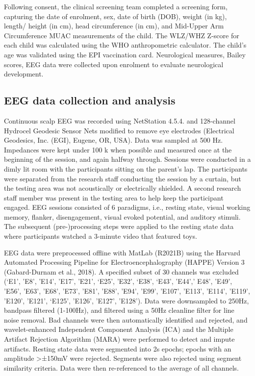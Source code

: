 \documentclass{article}
\begin{document}
Following consent, the clinical screening team completed a screening form, capturing the date of enrolment, sex, date of birth (DOB), weight (in kg), length/ height (in cm), head circumference (in cm), and Mid-Upper Arm Circumference \gls{MUAC} measurements of the child.
The \gls{WLZ/WHZ} Z-score for each child was calculated using the WHO anthropometric calculator.
The child's age was validated using the EPI vaccination card.
Neurological measures, Bailey scores, EEG data were collected upon enrolment to evaluate neurological development.

\subsection*{EEG data collection and analysis}
Continuous scalp EEG was recorded using NetStation 4.5.4. and 128-channel Hydrocel Geodesic Sensor Nets modified to remove eye electrodes (Electrical Geodesics, Inc. (EGI), Eugene, OR, USA).
Data was sampled at 500 Hz.
Impedances were kept under 100 k \textomega{} when possible and measured once at the beginning of the session, and again halfway through.
Sessions were conducted in a dimly lit room with the participants sitting on the parent’s lap.
The participants were separated from the research staff conducting the session by a curtain, but the testing area was not acoustically or electrically shielded.
A second research staff member was present in the testing area to help keep the participant engaged.
EEG sessions consisted of 6 paradigms, i.e., resting state, visual working memory, flanker, disengagement, visual evoked potential, and auditory stimuli.
The subsequent (pre-)processing steps were applied to the resting state data where participants watched a 3-minute video that featured toys.

EEG data were preprocessed offline with MatLab (R2021B) using the Harvard Automated Processing Pipeline for Electroencephalography (HAPPE) Version 3 (Gabard-Durnam et al., 2018).
A specified subset of 30 channels was excluded (‘E1’, ’E8’, ’E14’, ’E17’, ’E21’, ‘E25’, ’E32’, ‘E38’, ‘E43’, ’E44’,’ E48’, ’E49’, ’E56’, ’E63’, ’E68’, ’E73’, ’E81’, ’E88’, ’E94’, ’E99’, ’E107’, ’E113’, ’E114’, ’E119’, ’E120’, ’E121’, ‘E125', 'E126', 'E127', 'E128').
Data were downsampled to 250Hz, bandpass filtered (1-100Hz), and filtered using a 50Hz cleanline filter for line noise removal.
Bad channels were then automatically identified and rejected, and wavelet-enhanced Independent Component Analysis (ICA) and the Multiple Artifact Rejection Algorithm (MARA) were performed to detect and impute artifacts.
Resting state data were segmented into 2s epochs; epochs with an amplitude >±150mV were rejected.
Segments were also rejected using segment similarity criteria.
Data were then re-referenced to the average of all channels.
\end{document}
